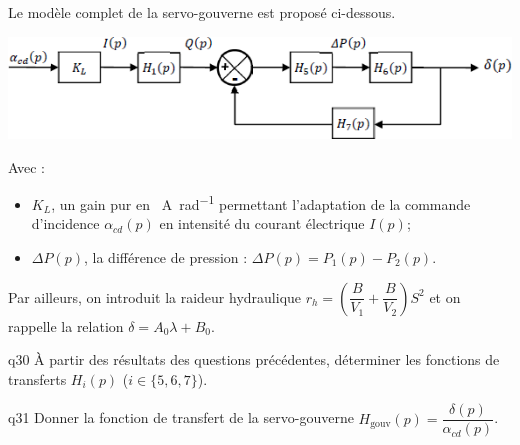 \begin{multicols}{2}
Le modèle complet de la servo-gouverne est proposé ci-dessous.
\begin{center}
\includegraphics[width=\linewidth]{images/fig_12}
\end{center}
Avec :
\begin{itemize}
\item $K_L$, un gain pur en \SI{}{A.rad^{-1}} permettant l’adaptation de la commande d’incidence $\alpha_{cd}(p)$ en intensité du courant électrique $I(p)$;
\item $\Delta P(p)$, la différence de pression : $\Delta P(p)=P_1(p)-P_2(p)$.
\end{itemize}
Par ailleurs, on introduit la raideur hydraulique $r_h=\left(\dfrac{B}{V_1}+\dfrac{B}{V_2} \right)S^2$ et on rappelle la relation $\delta=A_0\lambda + B_0$.



{\begin{question}{q30}
À partir des résultats des questions précédentes, déterminer les fonctions de transferts $H_i(p)$ ($i\in \{5,6,7\}$).
\ifprof
\begin{corrige}
\end{corrige}
\else
\fi
\begin{reponses}



\end{reponses} \end{question}}  


{\begin{question}{q31}
Donner la fonction de transfert de la servo-gouverne $H_{\text{gouv}}(p)=\dfrac{\delta(p)}{\alpha_{cd}(p)}$.
\ifprof
\begin{corrige}
\end{corrige}
\else
\fi
\begin{reponses}


\end{reponses}
\end{question}}
\end{multicols}
